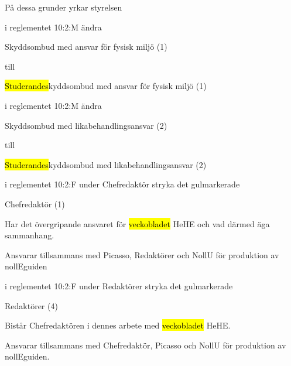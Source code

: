 \documentclass[../_main/handlingar.tex]{subfiles}
\begin{document}
På dessa grunder yrkar styrelsen
\begin{attsatser}
    
    \att i reglementet 10:2:M ändra 
        \begin{emptylist}
            \item Skyddsombud med ansvar för fysisk miljö (1)
         \end{emptylist}
    
        till 
    
        \begin{emptylist}
            \item \hl{Studerandes}kyddsombud med ansvar för fysisk miljö (1)
        \end{emptylist}
        \changenote

    \att i reglementet 10:2:M ändra 
        \begin{emptylist}
            \item Skyddsombud med likabehandlingsansvar (2)
         \end{emptylist}
    
        till 
    
        \begin{emptylist}
            \item \hl{Studerandes}kyddsombud med likabehandlingsansvar (2)
        \end{emptylist}
        \changenote
        
    \att i reglementet 10:2:F under Chefredaktör stryka det gulmarkerade
        \begin{emptylist}
            \item Chefredaktör (1)
            \begin{dashlist}
                \item Har det övergripande ansvaret för \hl{veckobladet} HeHE och vad därmed äga sammanhang. 
                \item Ansvarar tillsammans med Picasso, Redaktörer och NollU för produktion av nollEguiden
            \end{dashlist}
        \end{emptylist}
   

   \att i reglementet 10:2:F under Redaktörer stryka det gulmarkerade
        \begin{emptylist}
            \item Redaktörer (4) 
            \begin{dashlist}
                \item Bistår Chefredaktören i dennes arbete med \hl{veckobladet} HeHE. 
                \item Ansvarar tillsammans med Chefredaktör, Picasso och NollU för produktion av nollEguiden.
            \end{dashlist}
        \end{emptylist}



\end{attsatser}
\end{document}
